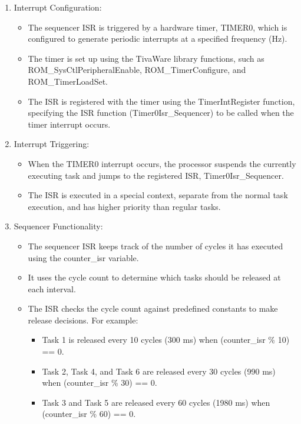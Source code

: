 \documentclass[a4paper,11pt]{article}%
\newenvironment{qanda}{\setlength{\parindent}{0pt}}{\bigskip}
\begin{document}
\begin{qanda}
\begin{enumerate}
			\begin{enumerate}
				\item Interrupt Configuration:
				      \begin{itemize}
					      \item The sequencer ISR is triggered by a hardware timer, TIMER0, which is configured to generate periodic interrupts at a specified frequency (Hz).
					      \item The timer is set up using the TivaWare library functions, such as ROM\_SysCtlPeripheralEnable, ROM\_TimerConfigure, and ROM\_TimerLoadSet.
					      \item The ISR is registered with the timer using the TimerIntRegister function, specifying the ISR function (Timer0Isr\_Sequencer) to be called when the timer interrupt occurs.
				      \end{itemize}
				\item Interrupt Triggering:
				      \begin{itemize}
					      \item When the TIMER0 interrupt occurs, the processor suspends the currently executing task and jumps to the registered ISR, Timer0Isr\_Sequencer.
					      \item The ISR is executed in a special context, separate from the normal task execution, and has higher priority than regular tasks.
				      \end{itemize}
				\item Sequencer Functionality:
				      \begin{itemize}
					      \item The sequencer ISR keeps track of the number of cycles it has executed using the counter\_isr variable.
					      \item It uses the cycle count to determine which tasks should be released at each interval.
					      \item The ISR checks the cycle count against predefined constants to make release decisions. For example:
					            \begin{itemize}
						            \item Task 1 is released every 10 cycles (300 ms) when (counter\_isr \% 10) == 0.
						            \item Task 2, Task 4, and Task 6 are released every 30 cycles (990 ms) when (counter\_isr \% 30) == 0.
						            \item Task 3 and Task 5 are released every 60 cycles (1980 ms) when (counter\_isr \% 60) == 0.

\end{itemize}
\end{itemize}
\end{enumerate}
\end{enumerate}
\end{qanda}
\end{document}
